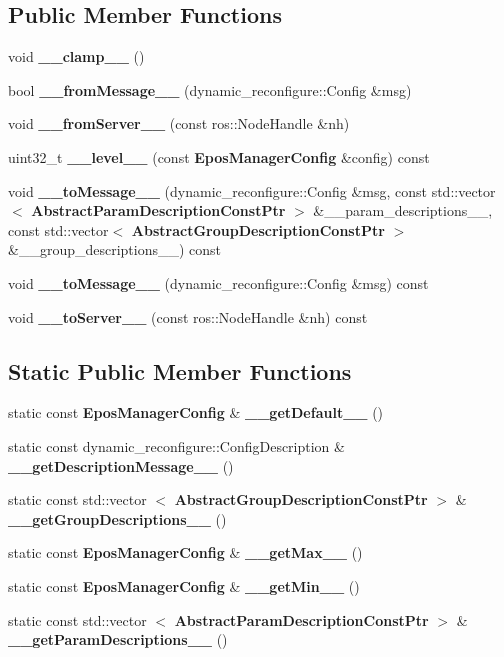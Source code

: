 \subsection*{\-Public \-Member \-Functions}
\begin{DoxyCompactItemize}
\item 
void {\bf \-\_\-\-\_\-clamp\-\_\-\-\_\-} ()
\item 
bool {\bf \-\_\-\-\_\-from\-Message\-\_\-\-\_\-} (dynamic\-\_\-reconfigure\-::\-Config \&msg)
\item 
void {\bf \-\_\-\-\_\-from\-Server\-\_\-\-\_\-} (const ros\-::\-Node\-Handle \&nh)
\item 
uint32\-\_\-t {\bf \-\_\-\-\_\-level\-\_\-\-\_\-} (const {\bf \-Epos\-Manager\-Config} \&config) const 
\item 
void {\bf \-\_\-\-\_\-to\-Message\-\_\-\-\_\-} (dynamic\-\_\-reconfigure\-::\-Config \&msg, const std\-::vector$<$ {\bf \-Abstract\-Param\-Description\-Const\-Ptr} $>$ \&\-\_\-\-\_\-param\-\_\-descriptions\-\_\-\-\_\-, const std\-::vector$<$ {\bf \-Abstract\-Group\-Description\-Const\-Ptr} $>$ \&\-\_\-\-\_\-group\-\_\-descriptions\-\_\-\-\_\-) const 
\item 
void {\bf \-\_\-\-\_\-to\-Message\-\_\-\-\_\-} (dynamic\-\_\-reconfigure\-::\-Config \&msg) const 
\item 
void {\bf \-\_\-\-\_\-to\-Server\-\_\-\-\_\-} (const ros\-::\-Node\-Handle \&nh) const 
\end{DoxyCompactItemize}
\subsection*{\-Static \-Public \-Member \-Functions}
\begin{DoxyCompactItemize}
\item 
static const {\bf \-Epos\-Manager\-Config} \& {\bf \-\_\-\-\_\-get\-Default\-\_\-\-\_\-} ()
\item 
static const \*
dynamic\-\_\-reconfigure\-::\-Config\-Description \& {\bf \-\_\-\-\_\-get\-Description\-Message\-\_\-\-\_\-} ()
\item 
static const std\-::vector\*
$<$ {\bf \-Abstract\-Group\-Description\-Const\-Ptr} $>$ \& {\bf \-\_\-\-\_\-get\-Group\-Descriptions\-\_\-\-\_\-} ()
\item 
static const {\bf \-Epos\-Manager\-Config} \& {\bf \-\_\-\-\_\-get\-Max\-\_\-\-\_\-} ()
\item 
static const {\bf \-Epos\-Manager\-Config} \& {\bf \-\_\-\-\_\-get\-Min\-\_\-\-\_\-} ()
\item 
static const std\-::vector\*
$<$ {\bf \-Abstract\-Param\-Description\-Const\-Ptr} $>$ \& {\bf \-\_\-\-\_\-get\-Param\-Descriptions\-\_\-\-\_\-} ()
\end{DoxyCompactItemize}

